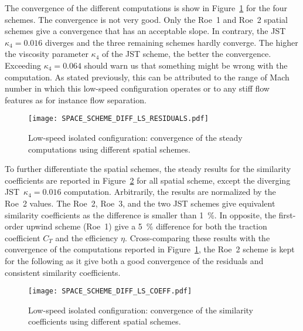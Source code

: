 The convergence of the different computations is show 
in Figure~\ref{fig:dream_ls_space_scheme_residual}
for the four schemes. The convergence is not 
very good. Only the Roe~1 and Roe~2 spatial schemes give 
a convergence that has an acceptable slope. In contrary,
the JST~$\kappa_4 = 0.016$ diverges and the three
remaining schemes hardly converge. The higher the
viscosity parameter $\kappa_4$ of the JST scheme, the better
the convergence. Exceeding $\kappa_4 = 0.064$ should
warn us that something might be wrong with the computation.
As stated previously, this can be attributed to the range of Mach
number in which this low-speed configuration operates
or to any stiff flow features as for instance flow separation.
\begin{figure}[htp]
  \centering
  \texttt{[image: SPACE\_SCHEME\_DIFF\_LS\_RESIDUALS.pdf]}
  \caption{Low-speed isolated configuration: convergence of the
  steady computations using different spatial schemes.}
  \label{fig:dream_ls_space_scheme_residual}
\end{figure}

To further differentiate the spatial schemes, 
the steady results for the similarity coefficients are reported
in Figure~\ref{fig:dream_ls_space_scheme_coeff} for all spatial scheme, 
except the diverging JST~$\kappa_4 = 0.016$ computation.
Arbitrarily, the results are normalized by the Roe~2 values.
The Roe~2, Roe~3, and the two JST schemes give equivalent
similarity coefficients as the difference is smaller than 1~\%.
In opposite, the first-order upwind scheme (Roe~1) give a 5~\%
difference for both the traction coefficient $C_T$ and the efficiency $\eta$.
Cross-comparing these results with the convergence of the computations
reported in Figure~\ref{fig:dream_ls_space_scheme_residual}, the Roe~2
scheme is kept for the following as it give both a good convergence
of the residuals and consistent similarity coefficients.
\begin{figure}[htp]
  \centering
  \texttt{[image: SPACE\_SCHEME\_DIFF\_LS\_COEFF.pdf]}
  \caption{Low-speed isolated configuration: convergence of the 
  similarity coefficients using different spatial schemes.}
  \label{fig:dream_ls_space_scheme_coeff}
\end{figure}

